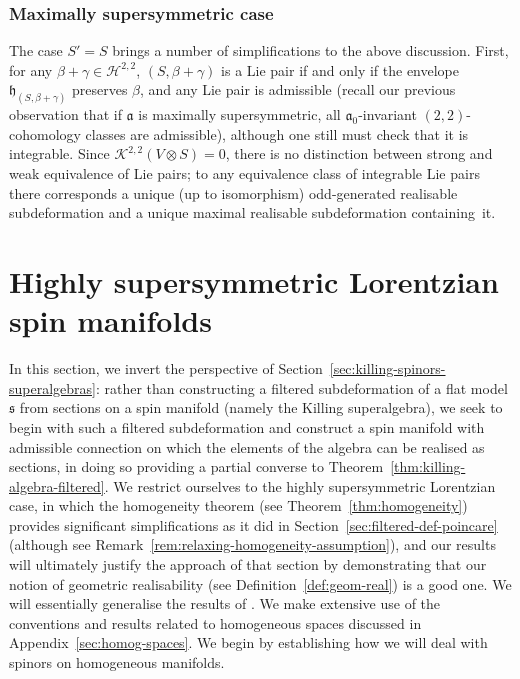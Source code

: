 \documentclass[10pt,a4paper]{amsart}
\numberwithin{equation}{section}
\newcommand{\fa}{\mathfrak{a}}
\newcommand{\fh}{\mathfrak{h}}
\newcommand{\fs}{\mathfrak{s}}
\newcommand{\cH}{\mathcal{H}}
\newcommand{\cK}{\mathcal{K}}
\newcommand{\1}{\mathbbm{1}}
\begin{document}
\subsubsection{Maximally supersymmetric case}

The case $S'=S$ brings a number of simplifications to the above discussion. First, for any $\beta+\gamma\in\cH^{2,2}$, $(S,\beta+\gamma)$ is a Lie pair if and only if the envelope $\fh_{(S,\beta+\gamma)}$ preserves $\beta$, and any Lie pair is admissible (recall our previous observation that if $\fa$ is maximally supersymmetric, all $\fa_0$-invariant $(2,2)$-cohomology classes are admissible), although one still must check that it is integrable. Since $\cK^{2,2}(V\otimes S)=0$, there is no distinction between strong and weak equivalence of Lie pairs; to any equivalence class of integrable Lie pairs there corresponds a unique (up to isomorphism) odd-generated realisable subdeformation and a unique maximal realisable subdeformation containing~it.

\section{Highly supersymmetric Lorentzian spin manifolds}
\label{sec:high-susy-spin-mfld}

In this section, we invert the perspective of Section~\ref{sec:killing-spinors-superalgebras}: rather than constructing a filtered subdeformation of a flat model $\fs$ from sections on a spin manifold (namely the Killing superalgebra), we seek to begin with such a filtered subdeformation and construct a spin manifold with admissible connection on which the elements of the algebra can be realised as sections, in doing so providing a partial converse to Theorem~\ref{thm:killing-algebra-filtered}. We restrict ourselves to the highly supersymmetric Lorentzian case, in which the homogeneity theorem (see Theorem~\ref{thm:homogeneity}) provides significant simplifications as it did in Section~\ref{sec:filtered-def-poincare} (although see Remark~\ref{rem:relaxing-homogeneity-assumption}), and our results will ultimately justify the approach of that section by demonstrating that our notion of geometric realisability (see Definition~\ref{def:geom-real}) is a good one. We will essentially generalise the results of \cite[Section~3.3]{Figueroa-OFarrill2017_1}. We make extensive use of the conventions and results related to homogeneous spaces discussed in Appendix~\ref{sec:homog-spaces}. We begin by establishing how we will deal with spinors on homogeneous manifolds.
\end{document}
